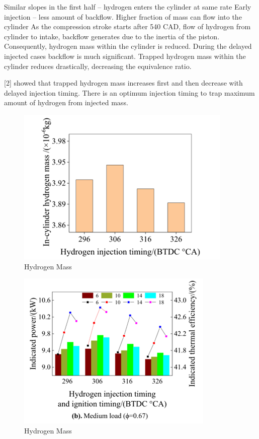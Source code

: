 \documentclass[conference]{IEEEtran}
\begin{document}
Similar slopes in the first half – hydrogen enters the cylinder at same rate
Early injection – less amount of backflow. Higher fraction of mass can flow into the cylinder
As the compression stroke starts after 540 CAD, flow of hydrogen from cylinder to intake, backflow generates due to the inertia of the piston. Consequently, hydrogen mass within the cylinder is reduced.  
During the delayed injected cases backflow is much significant.
Trapped hydrogen mass within the cylinder reduces drastically, decreasing the equivalence ratio.

[2] showed that trapped hydrogen mass increases first and then decrease with delayed injection timing. There is an optimum injection timing to trap maximum amount of hydrogen from injected mass.

\begin{figure}[htbp]
    \centerline{\includegraphics{figures/LR_IT_2.png}}
    \caption{Hydrogen Mass}
    \label{lr_it_2}
    \end{figure}

\begin{figure}[htbp]
        \centerline{\includegraphics{figures/LR_IT_3.png}}
        \caption{Hydrogen Mass}
        \label{lr_it_3}
        \end{figure}
\end{document}
